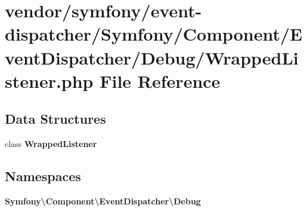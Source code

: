 \section{vendor/symfony/event-\/dispatcher/\+Symfony/\+Component/\+Event\+Dispatcher/\+Debug/\+Wrapped\+Listener.php File Reference}
\label{_wrapped_listener_8php}
\subsection*{Data Structures}
\begin{DoxyCompactItemize}
\item 
class {\bf Wrapped\+Listener}
\end{DoxyCompactItemize}
\subsection*{Namespaces}
\begin{DoxyCompactItemize}
\item 
 {\bf Symfony\textbackslash{}\+Component\textbackslash{}\+Event\+Dispatcher\textbackslash{}\+Debug}
\end{DoxyCompactItemize}
